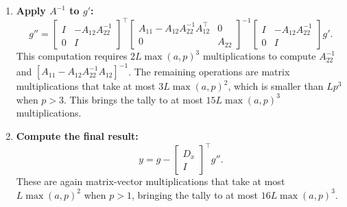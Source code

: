 \documentclass{article}
\begin{document}
\begin{enumerate}
    \item
          \textbf{Apply $A^{-1}$ to $g'$:}
          \[
              g'' =
              \begin{bmatrix}
                  I & -A_{12} A_{22}^{-1} \\ 0 & I
              \end{bmatrix}
              ^\top
              \begin{bmatrix}
                  A_{11} - A_{12} A_{22}^{-1} A_{12}^\top & 0      \\
                  0                                       & A_{22}
              \end{bmatrix}
              ^{-1}
              \begin{bmatrix}
                  I & -A_{12} A_{22}^{-1} \\ 0 & I
              \end{bmatrix}
              g'.
          \]
          This computation requires $2L\max(a,p)^3$ multiplications to compute
          $A_{22}^{-1}$ and $\left[A_{11}-A_{12} A_{22}^{-1}A_{12}\right]^{-1}$. The
          remaining operations are matrix multiplications that take at most
          $3L\max(a,p)^2$, which is smaller than $Lp^3$ when $p>3$. This brings the tally
          to at most $15L\max(a,p)^3$ multiplications.

    \item
          \textbf{Compute the final result:}
          \[
              y = g - \begin{bmatrix}
                  D_x \\ I
              \end{bmatrix}
              ^\top g''.
          \]
          These are again matrix-vector multiplications that take at most $L\max(a,p)^2$
          when $p>1$, bringing the tally to at most $16L\max(a,p)^3$.
\end{enumerate}



\end{document}
